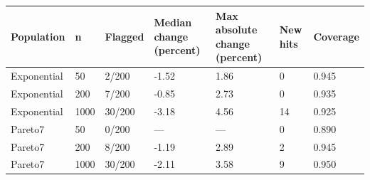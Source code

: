 \begin{tabular}{lllllll}
\toprule
Population & n & Flagged & Median change (percent) & Max absolute change (percent) & New hits & Coverage \\
\midrule
Exponential & 50 & 2/200 & -1.52 & 1.86 & 0 & 0.945 \\
Exponential & 200 & 7/200 & -0.85 & 2.73 & 0 & 0.935 \\
Exponential & 1000 & 30/200 & -3.18 & 4.56 & 14 & 0.925 \\
Pareto7 & 50 & 0/200 & --- & --- & 0 & 0.890 \\
Pareto7 & 200 & 8/200 & -1.19 & 2.89 & 2 & 0.945 \\
Pareto7 & 1000 & 30/200 & -2.11 & 3.58 & 9 & 0.950 \\
\bottomrule
\end{tabular}
